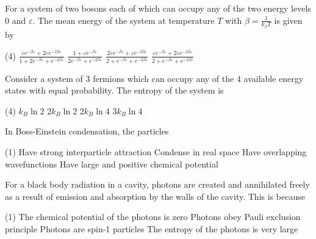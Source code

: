 \begin{enumerate}
	\item For a system of two bosons each of which can occupy any of the two energy levels 0 and $\varepsilon$. The mean energy of the system at temperature $T$ with $\beta=\frac{1}{k_{\beta} T}$ is given by
	{}
	
	\begin{tasks}(4)
		\task[\textbf{A.}] $\frac{\varepsilon e^{-\beta \varepsilon}+2 \varepsilon e^{-2 \beta \varepsilon}}{1+2 e^{-\beta \varepsilon}+e^{-2 \beta \varepsilon}}$
		\task[\textbf{B.}] $\frac{1+\varepsilon e^{-\beta \varepsilon}}{2 e^{-\beta \varepsilon}+e^{-2 \beta \varepsilon}}$
		\task[\textbf{C.}] $\frac{2 \varepsilon e^{-\beta \varepsilon}+\varepsilon e^{-2 \beta \varepsilon}}{2+e^{-\beta \varepsilon}+e^{-2 \beta \varepsilon}}$
		\task[\textbf{D.}] $\frac{\varepsilon e^{-\beta \varepsilon}+2 \varepsilon e^{-2 \beta \varepsilon}}{2+e^{-\beta \varepsilon}+e^{-2 \beta \varepsilon}}$
	\end{tasks}

	\begin{minipage}{\textwidth}
		\item Consider a system of 3 fermions which can occupy any of the 4 available energy states with equal probability. The entropy of the system is
		{}
	\end{minipage}
	\begin{tasks}(4)
		\task[\textbf{A.}] $k_{B} \ln 2$
		\task[\textbf{B.}] $2 k_{B} \ln 2$
		\task[\textbf{C.}]  $2 k_{B} \ln 4$
		\task[\textbf{D.}]  $3 k_{B} \ln 4$
	\end{tasks}
	\item In Boss-Einstein condensation, the particles
	{}
		\begin{tasks}(1)
		\task[\textbf{A.}] Have strong interparticle attraction
		\task[\textbf{B.}] Condense in real space
		\task[\textbf{C.}]  Have overlapping wavefunctions
		\task[\textbf{D.}] Have large and positive chemical potential
	\end{tasks}

	\begin{minipage}{\textwidth}
		\item For a black body radiation in a cavity, photons are created and annihilated freely as a result of emission and absorption by the walls of the cavity. This is because
		{\exyear{GATE 2015}}
	\end{minipage}
	\begin{tasks}(1)
		\task[\textbf{A.}] The chemical potential of the photons is zero
		\task[\textbf{B.}] Photons obey Pauli exclusion principle
		\task[\textbf{C.}] Photons are spin-1 particles
		\task[\textbf{D.}] The entropy of the photons is very large
	\end{tasks}
	

\end{enumerate}
